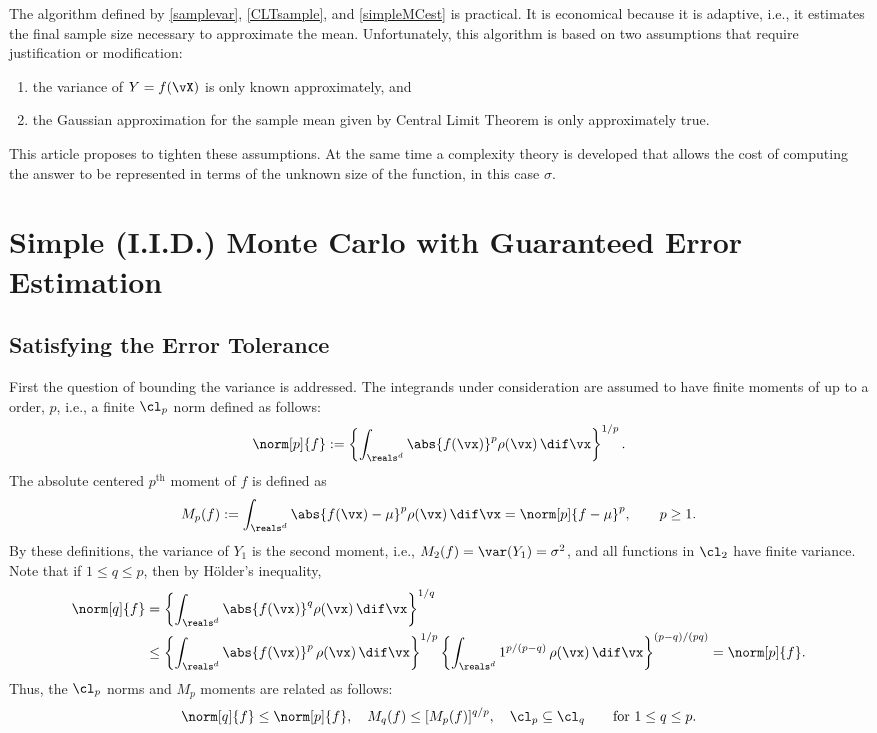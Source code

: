 \documentclass[graybox]{svmult}
\begin{document}
The algorithm defined by \eqref{samplevar}, \eqref{CLTsample}, and \eqref{simpleMCest} is practical.  It is economical because it is adaptive, i.e., it estimates the final sample size necessary to approximate the mean.  Unfortunately, this algorithm is based on two assumptions that require justification or modification:
\begin{enumerate}
\renewcommand{\labelenumi}{\roman{enumi})}
\item the variance of $Y=f(\vX)$ is only known approximately, and
\item the Gaussian approximation for the sample mean given by Central Limit Theorem is only approximately true.
\end{enumerate}
This article proposes to tighten these assumptions.  At the same time a complexity theory is developed that allows the cost of computing the answer to be represented in terms of the unknown size of the function, in this case $\sigma$.


\section{Simple (I.I.D.) Monte Carlo with Guaranteed Error Estimation}

\subsection{Satisfying the Error Tolerance} First the question of bounding the variance is addressed.  The integrands under consideration are assumed to have finite moments of up to a order, $p$, i.e., a finite $\cl_{p}$ norm defined as follows:
\[
\norm[p]{f} :=\left\{\int_{\reals^d} \abs{f(\vx)}^p \rho(\vx) \, \dif \vx\right\}^{1/p}.
\]
The absolute centered $p^{\text{th}}$ moment of $f$ is defined as
\begin{equation} \label{momentdef}
M_p(f) := \int_{\reals^d} \abs{f(\vx)-\mu}^p \rho(\vx) \, \dif \vx = \norm[p]{f - \mu}^p, \qquad p \ge 1.
\end{equation}
By these definitions, the variance of $Y_1$ is the second moment, i.e., $M_2(f) = \var(Y_1)=\sigma^2$, and all functions in $\cl_2$ have finite variance.  Note that if $1 \le q \le p$, then by H\"older's inequality,
\begin{align*}\label{LP}
\norm[q]{f} &=\left\{\int_{\reals^d} \abs{f(\vx)}^q \rho(\vx) \, \dif \vx\right\}^{1/q}\\
\nonumber & \le \left\{\int_{\reals^d} \abs{f(\vx)}^p \, \rho(\vx) \, \dif \vx \right\}^{1/p} \left\{\int_{\reals^d} 1^{p/(p-q)} \, \rho(\vx) \, \dif \vx\right\}^{(p-q)/(pq)} = \norm[p]{f}.
\end{align*}
Thus, the $\cl_p$ norms and $M_p$ moments are related as follows:  
\begin{equation} \label{clinclude}
\norm[q]{f} \le \norm[p]{f}, \quad M_q(f) \le [M_p(f)]^{q/p}, \quad \cl_p \subseteq \cl_q \qquad \text{for } 1 \le q \le p .
\end{equation}
\end{document}
